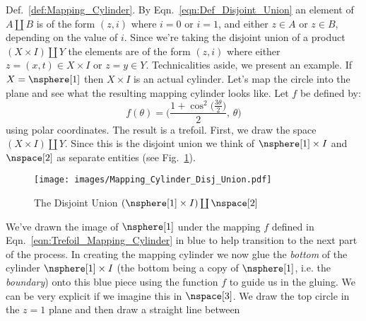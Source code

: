 \documentclass{book}                                                           %
\begin{document}
                Def.~\ref{def:Mapping_Cylinder}. By
                Eqn.~\ref{eqn:Def_Disjoint_Union} an element of $A\coprod{B}$ is
                of the form $(z,i)$ where $i=0$ or $i=1$, and either $z\in{A}$
                or $z\in{B}$, depending on the value of $i$. Since we're taking
                the disjoint union of a product $(X\times{I})\coprod{Y}$ the
                elements are of the form $(z,i)$ where either
                $z=(x,t)\in{X}\times{I}$ or $z=y\in{Y}$. Technicalities aside,
                we present an example. If $X=\nsphere[1]$ then $X\times{I}$ is
                an actual cylinder. Let's map the circle into the plane and see
                what the resulting mapping cylinder looks like. Let $f$ be
                defined by:
                \begin{equation}
                    \label{eqn:Trefoil_Mapping_Cylinder}%
                    f(\theta)=\Big(
                        \frac{1+\cos^{2}\big(\frac{3\theta}{2}\big)}{2},\,
                        \theta
                    \Big)
                \end{equation}
                using polar coordinates. The result is a trefoil. First, we draw
                the space $(X\times{I})\coprod{Y}$. Since this is
                the disjoint union we think of $\nsphere[1]\times{I}$ and
                $\nspace[2]$ as separate entities
                (see Fig.~\ref{fig:Ex_Mapping_Cylinder_Disj_Union}).
                \begin{figure}
                    \centering
                    \captionsetup{type=figure}
                    \texttt{[image: images/Mapping\_Cylinder\_Disj\_Union.pdf]}
                    \caption{The Disjoint Union
                             $(\nsphere[1]\times{I})\coprod\nspace[2]$}
                    \label{fig:Ex_Mapping_Cylinder_Disj_Union}
                \end{figure}
                We've drawn the image of $\nsphere[1]$ under the mapping $f$
                defined in Eqn.~\ref{eqn:Trefoil_Mapping_Cylinder} in blue to
                help transition to the next part of the process. In creating the
                mapping cylinder we now glue the \textit{bottom} of the cylinder
                $\nsphere[1]\times{I}$ (the bottom being a copy of
                $\nsphere[1]$, i.e. the \textit{boundary}) onto this blue piece
                using the function $f$ to guide us in the gluing. We can be very
                explicit if we imagine this in $\nspace[3]$. We draw the top
                circle in the $z=1$ plane and then draw a straight line between
\end{document}
